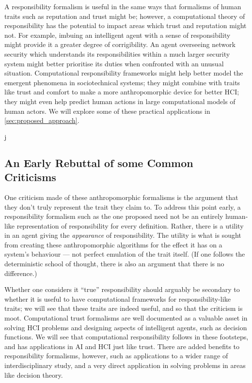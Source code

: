 A responsibility formalism is useful in the same ways that formalisms of human traits such as reputation and trust might be; however, a computational theory of responsibility has the potential to impact areas which trust and reputation might not. For example, imbuing an intelligent agent with a sense of responsibility might provide it a greater degree of corrigibility\cite{corrigibility}. An agent overseeing network security which understands its responsibilities within a much larger security system might better prioritise its duties when confronted with an unusual situation. Computational responsibility frameworks might help better model the emergent phenomena in sociotechnical systems; they might combine with traits like trust and comfort to make a more anthropomorphic device for better HCI\@; they might even help predict human actions in large computational models of human actors. We will explore some of these practical applications in \cref{sec:proposed_approach}.\par
j
\subsection{An Early Rebuttal of some Common Criticisms}
One criticism made of these anthropomorphic formalisms is the argument that they don't truly represent the trait they claim to. To address this point early, a responsibility formalism such as the one proposed need not be an entirely human-like representation of responsibility for every definition. Rather, there is a utility in an agent giving the \emph{appearance} of responsibility. The utility is what is sought from creating these anthropomorphic algorithms for the effect it has on a system's behaviour --- not perfect emulation of the trait itself. (If one follows the deterministic school of thought, there is also an argument that there is no difference\cite{determinism_in_brief}.) \par

Whether one considers it ``true'' responsibility should arguably be secondary to whether it is useful to have computational frameworks for responsibility-like traits; we will see that these traits are indeed useful, and so that the criticism is moot. Computational trust formalisms are well documented as a valuable asset in solving HCI problems and designing aspects of intelligent agents, such as decision functions. We will see that computational responsibility follows in these footsteps, and has applications in AI and HCI just like trust. There are added benefits to responsibility formalisms, however, such as applications to a wider range of interdisciplinary study, and a very direct application in solving problems in areas like decision theory.\par

